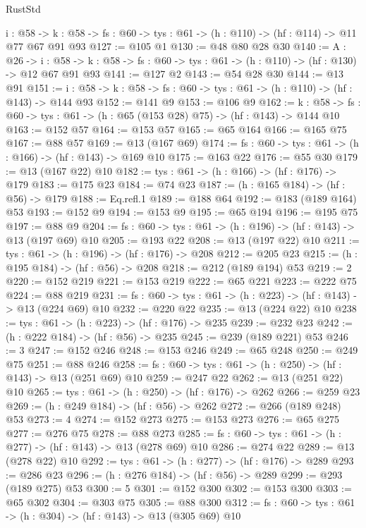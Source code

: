 \begin{lexlean}{RustStd}
\begin{coremodule}
{\begin{coremodule}
{{{{{  {i : @58} ->
  {k : @58} -> {fs : @60} -> {tys : @61} -> (h : @110) -> (hf : @114) -> @11 @77 @67 @91 @93
@127 := @105 @1
@130 := @48 @80 @28 @30
@140 := {A : @26} ->
  {i : @58} ->
  {k : @58} -> {fs : @60} -> {tys : @61} -> (h : @110) -> (hf : @130) -> @12 @67 @91 @93
@141 := @127 @2
@143 := @54 @28 @30
@144 := @13 @91
@151 := {i : @58} -> {k : @58} -> {fs : @60} -> {tys : @61} -> (h : @110) -> (hf : @143) -> @144 @93
@152 := @141 @9
@153 := @106 @9
@162 := {k : @58} ->
  {fs : @60} -> {tys : @61} -> (h : @65 (@153 @28) @75) -> (hf : @143) -> @144 @10
@163 := @152 @57
@164 := @153 @57
@165 := @65 @164
@166 := @165 @75
@167 := @88 @57
@169 := @13 (@167 @69)
@174 := {fs : @60} -> {tys : @61} -> (h : @166) -> (hf : @143) -> @169 @10
@175 := @163 @22
@176 := @55 @30
@179 := @13 (@167 @22) @10
@182 := {tys : @61} -> (h : @166) -> (hf : @176) -> @179
@183 := @175 @23
@184 := @74 @23
@187 := (h : @165 @184) -> (hf : @56) -> @179
@188 := Eq.refl.{1}
@189 := @188 @64
@192 := @183 (@189 @164) @53
@193 := @152 @9
@194 := @153 @9
@195 := @65 @194
@196 := @195 @75
@197 := @88 @9
@204 := {fs : @60} -> {tys : @61} -> (h : @196) -> (hf : @143) -> @13 (@197 @69) @10
@205 := @193 @22
@208 := @13 (@197 @22) @10
@211 := {tys : @61} -> (h : @196) -> (hf : @176) -> @208
@212 := @205 @23
@215 := (h : @195 @184) -> (hf : @56) -> @208
@218 := @212 (@189 @194) @53
@219 := 2
@220 := @152 @219
@221 := @153 @219
@222 := @65 @221
@223 := @222 @75
@224 := @88 @219
@231 := {fs : @60} -> {tys : @61} -> (h : @223) -> (hf : @143) -> @13 (@224 @69) @10
@232 := @220 @22
@235 := @13 (@224 @22) @10
@238 := {tys : @61} -> (h : @223) -> (hf : @176) -> @235
@239 := @232 @23
@242 := (h : @222 @184) -> (hf : @56) -> @235
@245 := @239 (@189 @221) @53
@246 := 3
@247 := @152 @246
@248 := @153 @246
@249 := @65 @248
@250 := @249 @75
@251 := @88 @246
@258 := {fs : @60} -> {tys : @61} -> (h : @250) -> (hf : @143) -> @13 (@251 @69) @10
@259 := @247 @22
@262 := @13 (@251 @22) @10
@265 := {tys : @61} -> (h : @250) -> (hf : @176) -> @262
@266 := @259 @23
@269 := (h : @249 @184) -> (hf : @56) -> @262
@272 := @266 (@189 @248) @53
@273 := 4
@274 := @152 @273
@275 := @153 @273
@276 := @65 @275
@277 := @276 @75
@278 := @88 @273
@285 := {fs : @60} -> {tys : @61} -> (h : @277) -> (hf : @143) -> @13 (@278 @69) @10
@286 := @274 @22
@289 := @13 (@278 @22) @10
@292 := {tys : @61} -> (h : @277) -> (hf : @176) -> @289
@293 := @286 @23
@296 := (h : @276 @184) -> (hf : @56) -> @289
@299 := @293 (@189 @275) @53
@300 := 5
@301 := @152 @300
@302 := @153 @300
@303 := @65 @302
@304 := @303 @75
@305 := @88 @300
@312 := {fs : @60} -> {tys : @61} -> (h : @304) -> (hf : @143) -> @13 (@305 @69) @10
}}}}}
\end{coremodule}}
\end{coremodule}
\end{lexlean}
